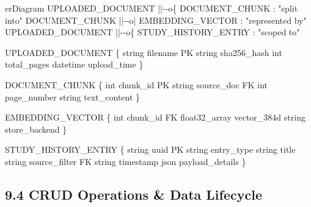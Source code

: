 \documentclass[
]{article}
\newenvironment{Shaded}{}{}
\newcommand{\NormalTok}[1]{#1}
\begin{document}
\begin{Shaded}
\begin{Highlighting}[]
\NormalTok{erDiagram}
\NormalTok{    UPLOADED\_DOCUMENT ||{-}{-}o\{ DOCUMENT\_CHUNK : "split into"}
\NormalTok{    DOCUMENT\_CHUNK ||{-}{-}o| EMBEDDING\_VECTOR : "represented by"}
\NormalTok{    UPLOADED\_DOCUMENT ||{-}{-}o\{ STUDY\_HISTORY\_ENTRY : "scoped to"}
    
\NormalTok{    UPLOADED\_DOCUMENT \{}
\NormalTok{        string filename PK}
\NormalTok{        string sha256\_hash}
\NormalTok{        int total\_pages}
\NormalTok{        datetime upload\_time}
\NormalTok{    \}}
    
\NormalTok{    DOCUMENT\_CHUNK \{}
\NormalTok{        int chunk\_id PK}
\NormalTok{        string source\_doc FK}
\NormalTok{        int page\_number}
\NormalTok{        string text\_content}
\NormalTok{    \}}
    
\NormalTok{    EMBEDDING\_VECTOR \{}
\NormalTok{        int chunk\_id FK}
\NormalTok{        float32\_array vector\_384d}
\NormalTok{        string store\_backend}
\NormalTok{    \}}
    
\NormalTok{    STUDY\_HISTORY\_ENTRY \{}
\NormalTok{        string uuid PK}
\NormalTok{        string entry\_type}
\NormalTok{        string title}
\NormalTok{        string source\_filter FK}
\NormalTok{        string timestamp}
\NormalTok{        json payload\_details}
\NormalTok{    \}}
\end{Highlighting}
\end{Shaded}

\subsection{9.4 CRUD Operations \& Data
Lifecycle}\label{crud-operations-data-lifecycle}
\end{document}
